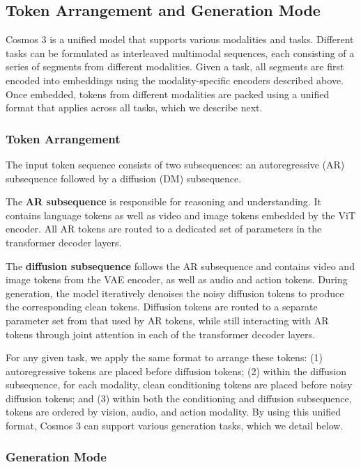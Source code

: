 \subsection{Token Arrangement and Generation Mode}
Cosmos 3 is a unified model that supports various modalities and tasks.
Different tasks can be formulated as interleaved multimodal sequences, each consisting of a series of segments from different modalities. Given a task, all segments are first encoded into embeddings using the modality-specific encoders described above. Once embedded, tokens from different modalities are packed using a unified format that applies across all tasks, which we describe next.

\subsubsection{Token Arrangement}
The input token sequence consists of two subsequences: an autoregressive (AR) subsequence followed by a diffusion (DM) subsequence. 

The \textbf{AR subsequence} is responsible for reasoning and understanding. It contains language tokens as well as video and image tokens embedded by the ViT encoder.
All AR tokens are routed to a dedicated set of parameters in the transformer decoder layers.

The \textbf{diffusion subsequence} follows the AR subsequence and contains video and image tokens from the VAE encoder, as well as audio and action tokens. During generation, the model iteratively denoises the noisy diffusion tokens to produce the corresponding clean tokens. Diffusion tokens are routed to a separate parameter set from that used by AR tokens, while still interacting with AR tokens through joint attention in each of the transformer decoder layers.

For any given task, we apply the same format to arrange these tokens: (1) autoregressive tokens are placed before diffusion tokens; (2) within the diffusion subsequence, for each modality, clean conditioning tokens are placed before noisy diffusion tokens; and (3) within both the conditioning and diffusion subsequence, tokens are ordered by vision, audio, and action modality.
By using this unified format, Cosmos 3 can support various generation tasks, which we detail below.


\subsubsection{Generation Mode}
\label{sec::generation_mode_def}

